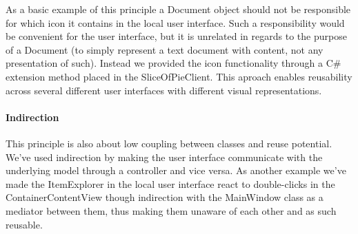 As a basic example of this principle a Document object should not be responsible for which icon it contains in the local user interface. Such a responsibility would be convenient for the user interface, but it is unrelated in regards to the purpose of a Document (to simply represent a text document with content, not any presentation of such). Instead we provided the icon functionality through a C\# extension method placed in the SliceOfPieClient. This aproach enables reusability across several different user interfaces with different visual representations.

\paragraph{Indirection}
This principle is also about low coupling between classes and reuse potential. We've used indirection by making the user interface communicate with the underlying model through a controller and vice versa. As another example we've made the ItemExplorer in the local user interface react to double-clicks in the ContainerContentView though indirection with the MainWindow class as a mediator between them, thus making them unaware of each other and as such reusable.
